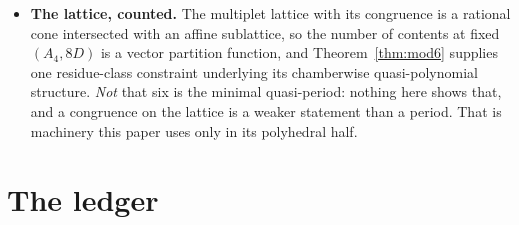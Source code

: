 \documentclass[11pt,a4paper]{article}
\begin{document}
\begin{itemize}
\eqref{eq:ladderab} sends the antiperiodic half to zero at $p=1$, so the branch point is fed by the
periodic moment alone. Whether that coincides with the bulk-localised divergent structure, with the
complementary parity sector feeding the boundary terms, is an interpretation and not a consequence
of the rung: it needs an explicit counterterm calculation. Whether the same
split works away from the pole --- one half feeding the higher-derivative bulk operator, the other
the boundary-localised one --- is what the Hurwitz correspondence of \S\ref{sec:novel} opens and
does not answer.
\item \textbf{The lattice, counted.} The multiplet lattice with its congruence is a rational cone
intersected with an affine sublattice, so the number of contents at fixed $(A_4,8D)$ is a vector
partition function, and Theorem~\ref{thm:mod6} supplies one residue-class constraint underlying its
chamberwise quasi-polynomial structure. \emph{Not} that six is the minimal quasi-period: nothing
here shows that, and a congruence on the lattice is a weaker statement than a period. That is
machinery this paper
uses only in its polyhedral half.
\end{itemize}

\section*{The ledger}
\end{document}

